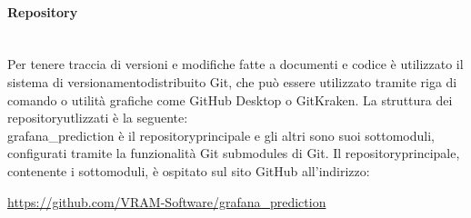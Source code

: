 	\paragraph{Repository}\mbox{}\\ [1mm]
		Per tenere traccia di versioni e modifiche fatte a documenti e codice è utilizzato il sistema di versionamento\glosp distribuito Git, che può essere utilizzato tramite riga di comando o utilità grafiche come GitHub Desktop o GitKraken.
		La struttura dei repository\glosp utlizzati è la seguente:
		\newline
		\mbox{}\\ %
		grafana\_prediction è il repository\glosp principale e gli altri sono suoi sottomoduli, configurati tramite la funzionalità Git submodules di Git.
		Il repository\glosp principale, contenente i sottomoduli, è ospitato sul sito GitHub all'indirizzo: 
		\begin{center}
			\url{https://github.com/VRAM-Software/grafana_prediction}
		\end{center}
